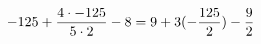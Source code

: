 \documentclass[preview]{standalone}
\begin{document}
\begin{align*}
\special{dvisvgm:raw <g id='unique000'>}-125 + \frac{4 \cdot -125}{5 \cdot 2} - 8 = 9 + 3(- \frac{125}{2}) - \frac{9}{2}\special{dvisvgm:raw </g>}
\end{align*}
\end{document}
